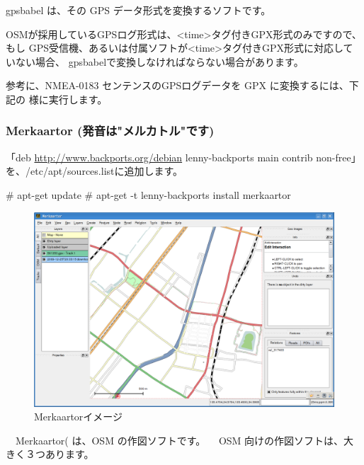 \documentclass[mingoth,a4paper]{jsarticle}
\begin{document}
gpsbabel は、その GPS データ形式を変換するソフトです。

OSMが採用しているGPSログ形式は、<time>タグ付きGPX形式のみですので、もし
GPS受信機、あるいは付属ソフトが<time>タグ付きGPX形式に対応していない場合、
gpsbabelで変換しなければならない場合があります。

参考に、NMEA-0183 センテンスのGPSログデータを GPX に変換するには、下記の
様に実行します。


\clearpage

\subsubsection{Merkaartor (発音は"メルカトル"です)}

「deb \url{http://www.backports.org/debian} lenny-backports main contrib non-free」を、/etc/apt/sources.listに追加します。

\begin{commandline}
# apt-get update
# apt-get -t lenny-backports install merkaartor
\end{commandline}

\begin{figure}
 \includegraphics[scale=0.28]{image200912/debianosm7.png}
 \caption{Merkaartorイメージ}
 \label{fig:debianosm7}
\end{figure}

　Merkaartor( は、OSM の作図ソフトです。
　OSM 向けの作図ソフトは、大きく３つあります。
\end{document}

